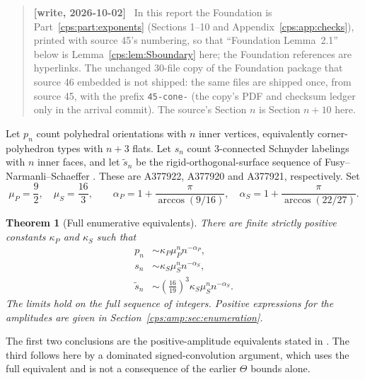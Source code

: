 \documentclass[11pt,letterpaper]{article}
\numberwithin{equation}{section}
\newtheorem{theorem}{Theorem}[section]
\theoremstyle{remark}\newtheorem{remark}[theorem]{Remark}
\newenvironment{writenote}{\begin{quote}\small\sloppy\textbf{[write, 2026-10-02]}\ }{\end{quote}}
\begin{document}
\begin{writenote}
In this report the Foundation is Part~\ref{cps:part:exponents} (Sections 1--10 and
Appendix~\ref{cps:app:checks}), printed with source 45's numbering, so that ``Foundation
Lemma~2.1'' below is Lemma~\ref{cps:lem:Sboundary} here; the Foundation references are
hyperlinks. The unchanged 30-file copy of the Foundation package that source 46 embedded is not
shipped: the same files are shipped once, from source 45, with the prefix \texttt{45-cone-}
(the copy's PDF and checksum ledger only in the arrival commit). The source's Section $n$ is
Section $n+10$ here.
\end{writenote}

Let $p_n$ count polyhedral orientations with $n$ inner vertices, equivalently corner-polyhedron types with $n+3$ flats. Let $s_n$ count 3-connected Schnyder labelings with $n$ inner faces, and let $\widetilde s_n$ be the rigid-orthogonal-surface sequence of Fusy--Narmanli--Schaeffer \cite{FNS}. These are A377922, A377920 and A377921, respectively. Set
\begin{equation}\label{cps:amp:eq:parameters}
 \mu_P=\frac92,\quad \mu_S=\frac{16}3,\qquad
 \alpha_P=1+\frac{\pi}{\arccos(9/16)},\quad
 \alpha_S=1+\frac{\pi}{\arccos(22/27)}.
\end{equation}

\begin{theorem}[Full enumerative equivalents]\label{cps:amp:thm:main}
There are finite strictly positive constants $\kappa_P$ and $\kappa_S$ such that
\begin{align}
 p_n&\sim\kappa_P\mu_P^n n^{-\alpha_P},\label{cps:amp:eq:Pmain}\\
 s_n&\sim\kappa_S\mu_S^n n^{-\alpha_S},\label{cps:amp:eq:Smain}\\
 \widetilde s_n&\sim\left(\frac{16}{19}\right)^3\kappa_S\mu_S^n n^{-\alpha_S}.
 \label{cps:amp:eq:rigidmain}
\end{align}
The limits hold on the full sequence of integers. Positive expressions for the amplitudes are given in Section~\ref{cps:amp:sec:enumeration}.
\end{theorem}
The first two conclusions are the positive-amplitude equivalents stated in \cite[Conjecture 25]{FNS}. The third follows here by a dominated signed-convolution argument, which uses the full equivalent and is not a consequence of the earlier $\Theta$ bounds alone.
\end{document}
